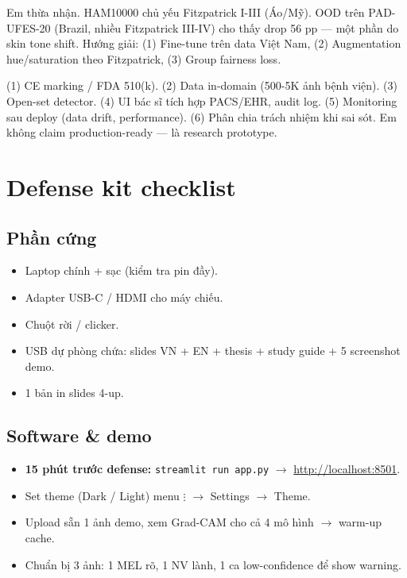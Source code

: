 \documentclass[11pt,a4paper]{article}
\begin{document}
\begin{qa}
Em thừa nhận. HAM10000 chủ yếu Fitzpatrick I-III (Áo/Mỹ). OOD trên PAD-UFES-20 (Brazil, nhiều Fitzpatrick III-IV) cho thấy drop 56 pp --- một phần do skin tone shift. Hướng giải: (1) Fine-tune trên data Việt Nam, (2) Augmentation hue/saturation theo Fitzpatrick, (3) Group fairness loss.
\end{qa}

\begin{qa}
(1) CE marking / FDA 510(k). (2) Data in-domain (500-5K ảnh bệnh viện). (3) Open-set detector. (4) UI bác sĩ tích hợp PACS/EHR, audit log. (5) Monitoring sau deploy (data drift, performance). (6) Phân chia trách nhiệm khi sai sót. Em không claim production-ready --- là research prototype.
\end{qa}

\section{Defense kit checklist}

\subsection{Phần cứng}
\begin{itemize}[leftmargin=*, itemsep=2pt]
  \item Laptop chính + sạc (kiểm tra pin đầy).
  \item Adapter USB-C / HDMI cho máy chiếu.
  \item Chuột rời / clicker.
  \item USB dự phòng chứa: slides VN + EN + thesis + study guide + 5 screenshot demo.
  \item 1 bản in slides 4-up.
\end{itemize}

\subsection{Software \& demo}
\begin{itemize}[leftmargin=*, itemsep=2pt]
  \item \textbf{15 phút trước defense:} \texttt{streamlit run app.py} $\to$ \url{http://localhost:8501}.
  \item Set theme (Dark / Light) menu $\vdots$ $\to$ Settings $\to$ Theme.
  \item Upload sẵn 1 ảnh demo, xem Grad-CAM cho cả 4 mô hình $\to$ warm-up cache.
  \item Chuẩn bị 3 ảnh: 1 MEL rõ, 1 NV lành, 1 ca low-confidence để show warning.
\end{itemize}
\end{document}
